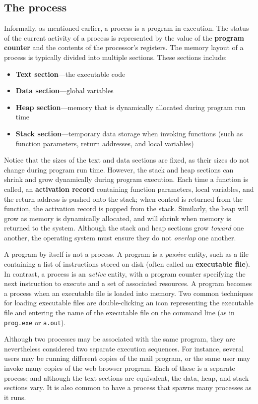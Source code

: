 \subsection*{The process}
Informally, as mentioned earlier, a process is a program in execution. The status of the current activity of a process is represented by the value of the \textbf{program counter} and the contents of the processor's registers. The memory layout of a process is typically divided into multiple sections. These sections include:
\begin{itemize}
    \item \textbf{Text section}---the executable code
    \item \textbf{Data section}---global variables
    \item \textbf{Heap section}---memory that is dynamically allocated during program run time
    \item \textbf{Stack section}---temporary data storage when invoking functions (such as function parameters, return addresses, and local variables)
\end{itemize}
Notice that the sizes of the text and data sections are fixed, as their sizes do not change during program run time. However, the stack and heap sections can shrink and grow dynamically during program execution. Each time a function is called, an \textbf{activation record} containing function parameters, local variables, and the return address is pushed onto the stack; when control is returned from the function, the activation record is popped from the stack. Similarly, the heap will grow as memory is dynamically allocated, and will shrink when memory is returned to the system. Although the stack and heap sections grow \textit{toward} one another, the operating system must ensure they do not \textit{overlap} one another.

A program by itself is not a process. A program is a \textit{passive} entity, such as a file containing a list of instructions stored on disk (often called an \textbf{executable file}). In contrast, a process is an \textit{active} entity, with a program counter specifying the next instruction to execute and a set of associated resources. A program becomes a process when an executable file is loaded into memory. Two common techniques for loading executable files are double-clicking an icon representing the executable file and entering the name of the executable file on the command line (as in \texttt{prog.exe} or \texttt{a.out}).

Although two processes may be associated with the same program, they are nevertheless considered two separate execution sequences. For instance, several users may be running different copies of the mail program, or the same user may invoke many copies of the web browser program. Each of these is a separate process; and although the text sections are equivalent, the data, heap, and stack sections vary. It is also common to have a process that spawns many processes as it runs.

